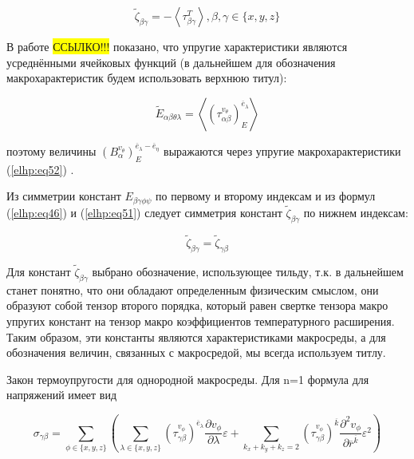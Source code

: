 \begin{equation}
    \label{elhp:eq51}
    \widetilde{\zeta}_{\beta \gamma} = 
    - \left< \tau_{\beta \gamma}^T \right> , \beta,\gamma \in \{x,y,z\} 
\end{equation}

В работе \colorbox{yellow}{ССЫЛКО!!!} показано, что упругие характеристики являются усреднёнными ячейковых
функций (в дальнейшем для обозначения макрохарактеристик будем использовать верхнюю
титул):

\begin{equation}
    \label{elhp:eq52}
    \widetilde{E}_{ \alpha\beta \theta\lambda} =
    \left< \left( \tau_{ \alpha\beta}^{ v_{\theta}} \right)_E^{ \overline{e}_{\lambda}}  \right> 
\end{equation}

поэтому величины 
$ \left( B_{\alpha}^{ v_{\theta}} \right)_E^{ \overline{e}_{\lambda} - \overline{e}_{\eta}} $
выражаются через упругие макрохарактеристики 
(\ref{elhp:eq52})
.

Из симметрии констант 
$E_{\beta\gamma \phi\psi}$
по первому и второму индексам и из формул 
(\ref{elhp:eq46})
и 
(\ref{elhp:eq51})
следует симметрия констант 
$ \widetilde{\zeta}_{\beta\gamma}$
по нижнем индексам:

\begin{equation}
    \label{elhp:eq53}
    \widetilde{\zeta}_{\beta\gamma} 
    =
    \widetilde{\zeta}_{\gamma\beta} 
\end{equation}

Для констант 
$ \widetilde{\zeta}_{\beta\gamma}$
выбрано обозначение, использующее тильду, т.к. в дальнейшем станет
понятно, что они обладают определенным физическим смыслом, они образуют собой тензор
второго порядка, который равен свертке тензора макро упругих констант на тензор макро
коэффициентов температурного расширения. Таким образом, эти константы являются
характеристиками макросреды, а для обозначения величин, связанных с макросредой, мы
всегда используем титлу.

Закон термоупругости для однородной макросреды. Для n=1 формула для
напряжений имеет вид

\begin{equation}
    \label{elhp:eq54}
    \sigma_{\gamma\beta} =
    \sum_{ \phi \in \{x,y,z\} } 
    \left( 
        \sum_{ \lambda \in \{x,y,z\} }
        \left( \tau_{\gamma\beta}^{v_{\phi}} \right)^{ \overline{e}_{\lambda}} 
        \frac{ \partial v_{\phi}}{ \partial \lambda} \varepsilon
        +
        \sum_{ k_x+k_y+k_z = 2 }
        \left( \tau_{\gamma\beta}^{v_{\phi}} \right)^{ \overline{k}} 
        \frac{ \partial^2 v_{\phi}}{ \partial \overline{r}^{ \overline{k} } } \varepsilon^2
    \right) 
\end{equation}

